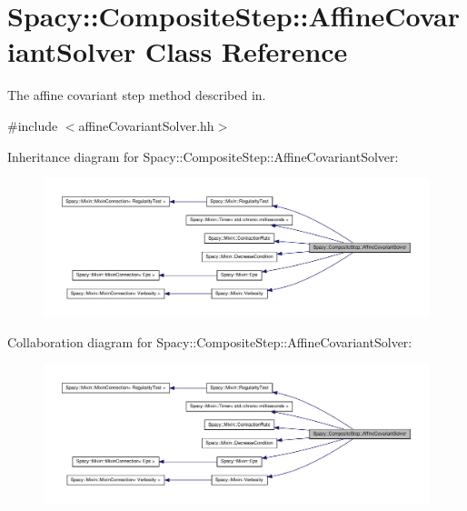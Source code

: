 \hypertarget{classSpacy_1_1CompositeStep_1_1AffineCovariantSolver}{\section{\-Spacy\-:\-:\-Composite\-Step\-:\-:\-Affine\-Covariant\-Solver \-Class \-Reference}
\label{classSpacy_1_1CompositeStep_1_1AffineCovariantSolver}
}


\-The affine covariant step method described in.  




{\ttfamily \#include $<$affine\-Covariant\-Solver.\-hh$>$}



\-Inheritance diagram for \-Spacy\-:\-:\-Composite\-Step\-:\-:\-Affine\-Covariant\-Solver\-:
\nopagebreak
\begin{figure}[H]
\begin{center}
\leavevmode
\includegraphics[width=350pt]{classSpacy_1_1CompositeStep_1_1AffineCovariantSolver__inherit__graph}
\end{center}
\end{figure}


\-Collaboration diagram for \-Spacy\-:\-:\-Composite\-Step\-:\-:\-Affine\-Covariant\-Solver\-:
\nopagebreak
\begin{figure}[H]
\begin{center}
\leavevmode
\includegraphics[width=350pt]{classSpacy_1_1CompositeStep_1_1AffineCovariantSolver__coll__graph}
\end{center}
\end{figure}
